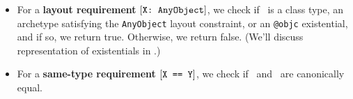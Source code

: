 \documentclass[../generics]{subfiles}
\begin{document}
\begin{algorithm}
\begin{itemize}
\begin{enumerate}
\end{enumerate}
\item For a \textbf{layout requirement} $[\texttt{X:~AnyObject}]$, we check if \tX\ is a class type, an archetype satisfying the \texttt{AnyObject} layout constraint, or an \texttt{@objc} existential, and if so, we return true. Otherwise, we return false. (We'll discuss representation of existentials in .)
\item For a \textbf{same-type requirement} $[\texttt{X == Y}]$, we check if \tX\ and \tY\ are canonically equal.
\end{itemize}
\end{algorithm}
\end{document}
